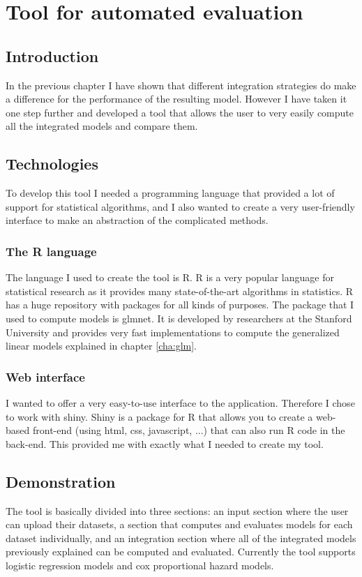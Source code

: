 \chapter{Tool for automated evaluation}
\label{cha:tool}

\section{Introduction}
\label{sec:tool-introduction}
In the previous chapter I have shown that different integration strategies do make a difference for the performance of the resulting model. However I have taken it one step further and developed a tool that allows the user to very easily compute all the integrated models and compare them.
\section{Technologies}
\label{sec:tool-technologies}
To develop this tool I needed a programming language that provided a lot of support for statistical algorithms, and I also wanted to create a very user-friendly interface to make an abstraction of the complicated methods.
\subsection{The R language}
The language I used to create the tool is R. R is a very popular language for statistical research as it provides many state-of-the-art algorithms in statistics. R has a huge repository with packages for all kinds of purposes. The package that I used to compute models is glmnet. It is developed by researchers at the Stanford University and provides very fast implementations to compute the generalized linear models explained in chapter \ref{cha:glm}. 
\subsection{Web interface}
I wanted to offer a very easy-to-use interface to the application. Therefore I chose to work with shiny. Shiny is a package for R that allows you to create a web-based front-end (using html, css, javascript, ...) that can also run R code in the back-end. This provided me with exactly what I needed to create my tool.
\section{Demonstration}
\label{sec:tool-demonstration}
The tool is basically divided into three sections: an input section where the user can upload their datasets, a section that computes and evaluates models for each dataset individually, and an integration section where all of the integrated models previously explained can be computed and evaluated. Currently the tool supports logistic regression models and cox proportional hazard models.
